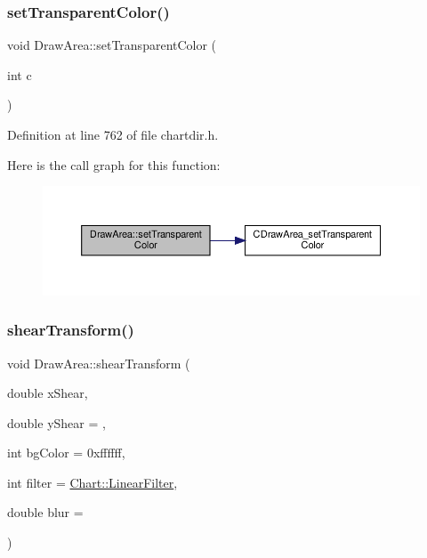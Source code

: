 \subsubsection{\texorpdfstring{set\+Transparent\+Color()}{setTransparentColor()}}
{\footnotesize\ttfamily void Draw\+Area\+::set\+Transparent\+Color (\begin{DoxyParamCaption}\item[{int}]{c }\end{DoxyParamCaption})\hspace{0.3cm}{\ttfamily [inline]}}



Definition at line 762 of file chartdir.\+h.

Here is the call graph for this function\+:
\nopagebreak
\begin{figure}[H]
\begin{center}
\leavevmode
\includegraphics[width=350pt]{class_draw_area_a454536e57a331ef65bbf51b30255b5d3_cgraph}
\end{center}
\end{figure}
\mbox{\label{class_draw_area_a547ec9c5a3dae897a4dce221132bbd09}} 
\subsubsection{\texorpdfstring{shear\+Transform()}{shearTransform()}}
{\footnotesize\ttfamily void Draw\+Area\+::shear\+Transform (\begin{DoxyParamCaption}\item[{double}]{x\+Shear,  }\item[{double}]{y\+Shear = {},  }\item[{int}]{bg\+Color = {\ttfamily 0xffffff},  }\item[{int}]{filter = {\ttfamily \hyperlink{namespace_chart_ab75b9aa1781d0e0159ef1d441b577764a8cd729b7a982bac2dce8b021511e3ac6}{Chart\+::\+Linear\+Filter}},  }\item[{double}]{blur = {} }\end{DoxyParamCaption})\hspace{0.3cm}{\ttfamily [inline]}}



